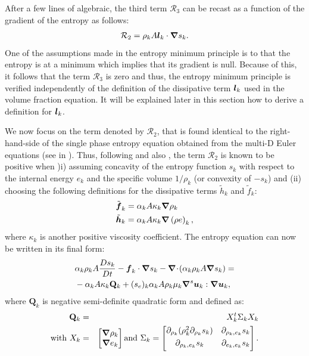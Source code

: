 After a few lines of algebraic, the third term ${\mathcal{R}_3}$ can be recast as a function of the gradient of the entropy as follows:
\begin{align}
 \label{eq:ent-R3-sct4}
  \mathcal{R}_2  =  \rho_k A \boldsymbol l_k \cdot \boldsymbol{\nabla} s_k.
\end{align} 
One of the assumptions made in the entropy minimum principle is to that the entropy 
is at a minimum which implies that its gradient is null. Because of this, it follows that
the term $\mathcal{R}_3$ is zero and thus, the entropy minimum principle is verified
independently of the definition of the dissipative term $\boldsymbol l_k$ used in the volume fraction
equation. It will be explained later in this section how to derive a definition for $\boldsymbol l_k$.

We now focus on the term denoted by $\mathcal{R}_2$, that is found identical to the right-hand-side of the single phase entropy equation obtained from the multi-D Euler equations (see  in ). Thus, following \cite{jlg} and also , the term $\mathcal{R}_2$ is known to be positive when )i) assuming concavity of the entropy function $s_k$ with respect to the internal energy $e_k$ and the specific volume $1 / \rho_k$ (or convexity of $-s_k$) and (ii) choosing the following definitions for the dissipative terms $\tilde{h}_k$ and $\tilde{f}_k$:
%
\begin{align}
&\tilde{\boldsymbol f}_k = \alpha_k A \kappa_k \boldsymbol{\nabla} \rho_k \\
&\tilde{\boldsymbol h}_k = \alpha_k A \kappa_k \boldsymbol{\nabla} \left( \rho e \right)_k,
\end{align}
%  
where $\kappa_k$ is another positive viscosity coefficient. The entropy equation can now be written in its final form:
%
\begin{align}\label{eq:ent-res-7-eqn-diss-terms3}
&\alpha_k \rho_k A \frac{Ds_k}{Dt} - \boldsymbol f_k \cdot \boldsymbol{\nabla} s_k - \boldsymbol{\nabla}\! \cdot \! \left( \alpha_k \rho_k A \boldsymbol{\nabla} s_k \right) = \nonumber\\
&- \alpha_k A \kappa_k \mathbf{Q}_k + (s_e)_k \alpha_k A \rho_k \mu_k \boldsymbol{\nabla}^s \boldsymbol u_k : \boldsymbol{\nabla} \boldsymbol u_k,
\end{align}
%
where $\mathbf{Q}_k$ is negative semi-definite quadratic form and defined as:
%
\begin{eqnarray}
\mathbf{Q}_k &=& X^t_k \Sigma_k X_k \nonumber \\
\text{with } X_k &=& \begin{bmatrix}
\boldsymbol{\nabla} \rho_k \\
\boldsymbol{\nabla} e_k 
\end{bmatrix}
\text{and } \Sigma_k = \begin{bmatrix}
       \partial_{\rho_k} (\rho^2_k \partial_{\rho_k} s_k) & \partial_{\rho_k,e_k} s_k  \\[0.3em]
       \partial_{\rho_k,e_k} s_k & \partial_{e_k,e_k} s_k           \\[0.3em]
     \end{bmatrix}. \nonumber 
\end{eqnarray}
